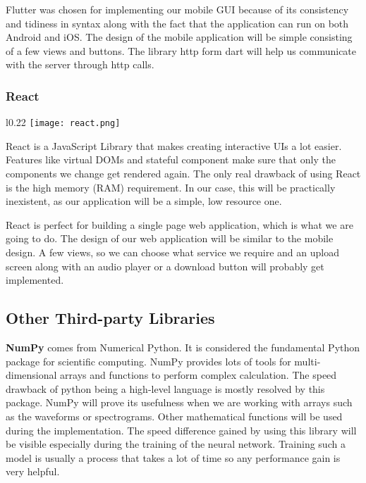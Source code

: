 \documentclass[../Thesis.tex]{subfiles}
\begin{document}
Flutter was chosen for implementing our mobile GUI because of its consistency and tidiness in syntax along with the fact that the application can run on both Android and iOS. The design of the mobile application will be simple consisting of a few views and buttons. The library http form dart will help us communicate with the server through http calls.


\subsubsection {React}

\begin{wrapfigure}{l}{0.22\textwidth}
\label {fig: react}
\texttt{[image: react.png]}
\end{wrapfigure}
React is a JavaScript Library that makes creating interactive UIs a lot easier. Features like virtual DOMs and stateful component make sure that only the components we change get rendered again. The only real drawback of using React is the high memory (RAM) requirement. In our case, this will be practically inexistent, as our application will be a simple, low resource one. 

React is perfect for building a single page web application, which is what we are going to do.
The design of our web application will be similar to the mobile design. A few views, so we can choose what service we require and an upload screen along with an audio player or a download button will probably get implemented.

\subsection {Other Third-party Libraries}

\textbf{NumPy} comes from Numerical Python. It is considered the fundamental Python package for scientific computing. NumPy provides lots of tools for multi-dimensional arrays and functions to perform complex calculation. The speed drawback of python being a high-level language is mostly resolved by this package.
NumPy will prove its usefulness when we are working with arrays such as the waveforms or spectrograms. Other mathematical functions will be used during the implementation.  The speed difference gained by using this library will be visible especially during the training of the neural network. Training such a model is usually a process that takes a lot of time so any performance gain is very helpful. 
\end{document}
